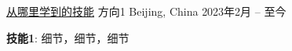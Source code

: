 

\begin{cventries}

  \cventry
    {\underline{从哪里学到的技能}} %
    {方向1} %
    {Beijing, China} %
    {2023年2月 -- 至今} %
    {
      \begin{cvitems} %
        \item {\textbf{技能1}: 细节，细节，细节}
      \end{cvitems}
    }


    
\end{cventries}
